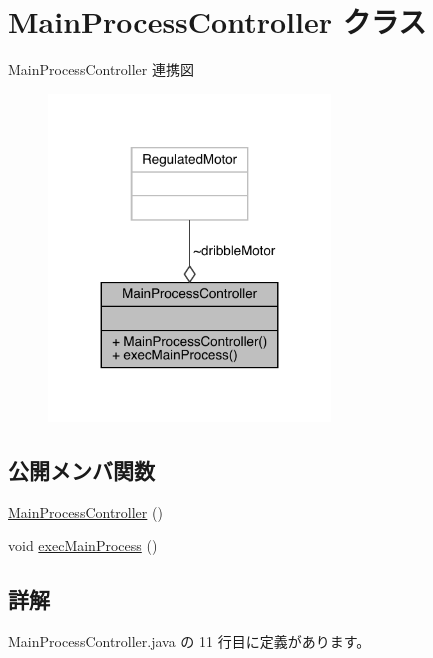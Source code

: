 \hypertarget{class_main_process_controller}{}\section{Main\+Process\+Controller クラス}
\label{class_main_process_controller}


Main\+Process\+Controller 連携図
\nopagebreak
\begin{figure}[H]
\begin{center}
\leavevmode
\includegraphics[width=212pt]{df/dc7/class_main_process_controller__coll__graph}
\end{center}
\end{figure}
\subsection*{公開メンバ関数}
\begin{DoxyCompactItemize}
\item 
\mbox{\hyperlink{class_main_process_controller_af422b069cc9f6cadb45a64ef985bd536}{Main\+Process\+Controller}} ()
\item 
void \mbox{\hyperlink{class_main_process_controller_ac92bd6b23aa4c17913d6a9c63ee72739}{exec\+Main\+Process}} ()
\end{DoxyCompactItemize}


\subsection{詳解}


 Main\+Process\+Controller.\+java の 11 行目に定義があります。



